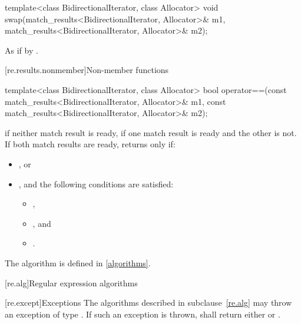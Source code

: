 %
\begin{itemdecl}
template<class BidirectionalIterator, class Allocator>
  void swap(match_results<BidirectionalIterator, Allocator>& m1,
            match_results<BidirectionalIterator, Allocator>& m2);
\end{itemdecl}

\pnum
\effects
As if by .

[re.results.nonmember]{Non-member functions}

%
\begin{itemdecl}
template<class BidirectionalIterator, class Allocator>
bool operator==(const match_results<BidirectionalIterator, Allocator>& m1,
                const match_results<BidirectionalIterator, Allocator>& m2);
\end{itemdecl}

\begin{itemdescr}
\pnum
\returns
{} if neither match result is ready,  if one match result is ready and the
other is not. If both match results are ready, returns  only if:
\begin{itemize}
\item
{}, or

\item
{}, and the following conditions are satisfied:
\begin{itemize}
\item
{},

\item
{}, and

\item
{}.
\end{itemize}
\end{itemize}
\begin{note}
The algorithm  is defined in \ref{algorithms}.
\end{note}
\end{itemdescr}

[re.alg]{Regular expression algorithms}

[re.except]{Exceptions}
\pnum
The algorithms described in subclause~\ref{re.alg} may throw an exception
of type . If such an exception  is thrown,
 shall return either 
or .


